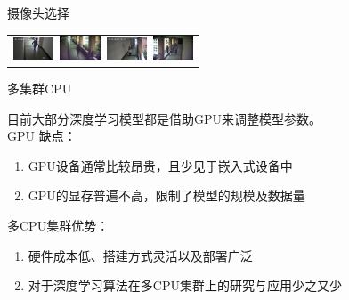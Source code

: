\begin{frame}{摄像头选择}
\begin{table}
\begin{tabular}{c}
    \includegraphics[width=12mm]{figures/3-4}~\includegraphics[width=12mm]{figures/3-5}~\includegraphics[width=12mm]{figures/3-6}~\includegraphics[width=12mm]{figures/3-7} \\
    \end{tabular}
    \end{table}
    \end{frame}


    \begin{frame}{多集群CPU}
    \begin{block}{}
    目前大部分深度学习模型都是借助GPU来调整模型参数。\\
    GPU 缺点：
    \begin{enumerate}
        \item GPU设备通常比较昂贵，且少见于嵌入式设备中
        \item GPU的显存普遍不高，限制了模型的规模及数据量
    \end{enumerate}
    多CPU集群优势：
    \begin{enumerate}
        \item 硬件成本低、搭建方式灵活以及部署广泛
        \item 对于深度学习算法在多CPU集群上的研究与应用少之又少
    \end{enumerate}
    \end{block}
    \end{frame}
